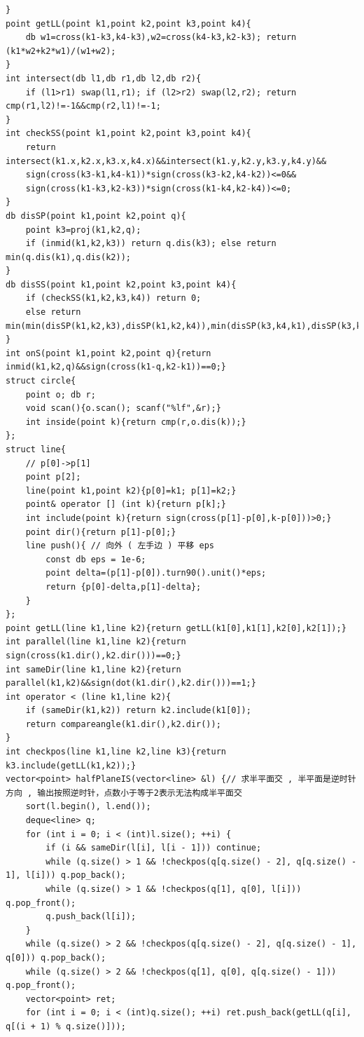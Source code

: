 \documentclass[twoside]{article}
\begin{document}
\begin{lstlisting}
}
point getLL(point k1,point k2,point k3,point k4){
    db w1=cross(k1-k3,k4-k3),w2=cross(k4-k3,k2-k3); return (k1*w2+k2*w1)/(w1+w2);
}
int intersect(db l1,db r1,db l2,db r2){
    if (l1>r1) swap(l1,r1); if (l2>r2) swap(l2,r2); return cmp(r1,l2)!=-1&&cmp(r2,l1)!=-1;
}
int checkSS(point k1,point k2,point k3,point k4){
    return intersect(k1.x,k2.x,k3.x,k4.x)&&intersect(k1.y,k2.y,k3.y,k4.y)&&
    sign(cross(k3-k1,k4-k1))*sign(cross(k3-k2,k4-k2))<=0&&
    sign(cross(k1-k3,k2-k3))*sign(cross(k1-k4,k2-k4))<=0;
}
db disSP(point k1,point k2,point q){
    point k3=proj(k1,k2,q);
    if (inmid(k1,k2,k3)) return q.dis(k3); else return min(q.dis(k1),q.dis(k2));
}
db disSS(point k1,point k2,point k3,point k4){
    if (checkSS(k1,k2,k3,k4)) return 0;
    else return min(min(disSP(k1,k2,k3),disSP(k1,k2,k4)),min(disSP(k3,k4,k1),disSP(k3,k4,k2)));
}
int onS(point k1,point k2,point q){return inmid(k1,k2,q)&&sign(cross(k1-q,k2-k1))==0;}
struct circle{
    point o; db r;
    void scan(){o.scan(); scanf("%lf",&r);}
    int inside(point k){return cmp(r,o.dis(k));}
};
struct line{
    // p[0]->p[1]
    point p[2];
    line(point k1,point k2){p[0]=k1; p[1]=k2;}
    point& operator [] (int k){return p[k];}
    int include(point k){return sign(cross(p[1]-p[0],k-p[0]))>0;}
    point dir(){return p[1]-p[0];}
    line push(){ // 向外 ( 左手边 ) 平移 eps 
        const db eps = 1e-6;
        point delta=(p[1]-p[0]).turn90().unit()*eps;
        return {p[0]-delta,p[1]-delta};
    }
};
point getLL(line k1,line k2){return getLL(k1[0],k1[1],k2[0],k2[1]);}
int parallel(line k1,line k2){return sign(cross(k1.dir(),k2.dir()))==0;}
int sameDir(line k1,line k2){return parallel(k1,k2)&&sign(dot(k1.dir(),k2.dir()))==1;}
int operator < (line k1,line k2){
    if (sameDir(k1,k2)) return k2.include(k1[0]); 
    return compareangle(k1.dir(),k2.dir());
}
int checkpos(line k1,line k2,line k3){return k3.include(getLL(k1,k2));}
vector<point> halfPlaneIS(vector<line> &l) {// 求半平面交 , 半平面是逆时针方向 , 输出按照逆时针，点数小于等于2表示无法构成半平面交
    sort(l.begin(), l.end());
    deque<line> q;
    for (int i = 0; i < (int)l.size(); ++i) {
        if (i && sameDir(l[i], l[i - 1])) continue;
        while (q.size() > 1 && !checkpos(q[q.size() - 2], q[q.size() - 1], l[i])) q.pop_back();
        while (q.size() > 1 && !checkpos(q[1], q[0], l[i])) q.pop_front();
        q.push_back(l[i]);
    }
    while (q.size() > 2 && !checkpos(q[q.size() - 2], q[q.size() - 1], q[0])) q.pop_back();
    while (q.size() > 2 && !checkpos(q[1], q[0], q[q.size() - 1])) q.pop_front();
    vector<point> ret;
    for (int i = 0; i < (int)q.size(); ++i) ret.push_back(getLL(q[i], q[(i + 1) % q.size()]));

\end{lstlisting}
\end{document}
